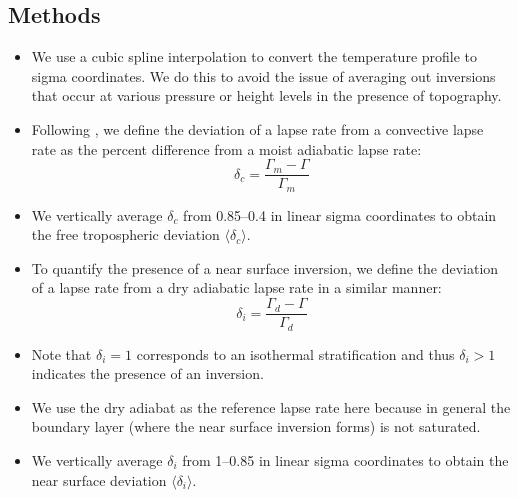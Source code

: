 \documentclass{ametsocV5}
\begin{document}

%
%

\appendix[A]
\subsection{Methods}
\begin{itemize}
  \item We use a cubic spline interpolation to convert the temperature profile to sigma coordinates. We do this to avoid the issue of averaging out inversions that occur at various pressure or height levels in the presence of topography.
  \item Following \cite{stone1979}, we define the deviation of a lapse rate from a convective lapse rate as the percent difference from a moist adiabatic lapse rate:
        \begin{equation}
          \delta_{c} = \frac{\Gamma_{m}-\Gamma}{\Gamma_{m}}
        \end{equation}
  \item We vertically average \(\delta_{c}\) from 0.85--0.4 in linear sigma coordinates to obtain the free tropospheric deviation \(\langle \delta_{c} \rangle\).
  \item To quantify the presence of a near surface inversion, we define the deviation of a lapse rate from a dry adiabatic lapse rate in a similar manner:
        \begin{equation}
          \delta_{i} = \frac{\Gamma_{d}-\Gamma}{\Gamma_{d}}
        \end{equation}
  \item Note that \(\delta_{i}=1\) corresponds to an isothermal stratification and thus \(\delta_{i}>1\) indicates the presence of an inversion.
  \item We use the dry adiabat as the reference lapse rate here because in general the boundary layer (where the near surface inversion forms) is not saturated.
  \item We vertically average \(\delta_{i}\) from 1--0.85 in linear sigma coordinates to obtain the near surface deviation \(\langle \delta_{i} \rangle\).
\end{itemize}
\end{document}
